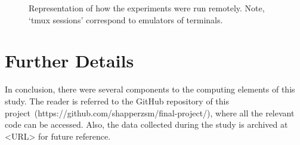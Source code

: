 \begin{figure}
    \centering
    
    \caption{Representation of how the experiments were run remotely. Note, `tmux sessions' correspond to emulators of terminals.}\label{fig:restate_remote_comp}
\end{figure}

\section{Further Details}
In conclusion, there were several components to the computing elements of this
study. The reader is referred to the GitHub repository of this 
project~(https://github.com/shapperzsm/final-project/),
where all the relevant code can be accessed. Also, the data collected during the
study is archived at <URL> for future reference.
